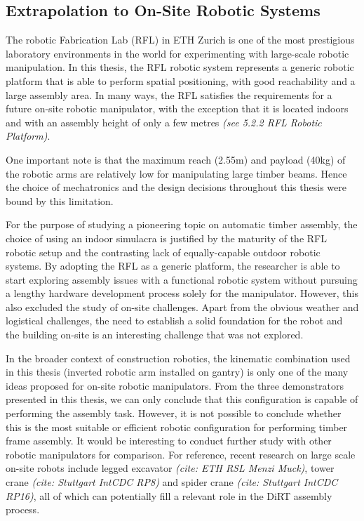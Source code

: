 \subsection{Extrapolation to On-Site Robotic Systems}

The robotic Fabrication Lab (RFL) in ETH Zurich is one of the most prestigious laboratory environments in the world for experimenting with large-scale robotic manipulation. In this thesis, the RFL robotic system represents a generic robotic platform that is able to perform spatial positioning, with good reachability and a large assembly area. In many ways, the RFL satisfies the requirements for a future on-site robotic manipulator, with the exception that it is located indoors and with an assembly height of only a few metres \textit{(see 5.2.2 RFL Robotic Platform)}. 

One important note is that the maximum reach (2.55m) and payload (40kg) of the robotic arms are relatively low for manipulating large timber beams. Hence the choice of mechatronics and the design decisions throughout this thesis were bound by this limitation. 

For the purpose of studying a pioneering topic on automatic timber assembly, the choice of using an indoor simulacra is justified by the maturity of the RFL robotic setup and the contrasting lack of equally-capable outdoor robotic systems. By adopting the RFL as a generic platform, the researcher is able to start exploring assembly issues with a functional robotic system without pursuing a lengthy hardware development process solely for the manipulator. However, this also excluded the study of on-site challenges. Apart from the obvious weather and logistical challenges, the need to establish a solid foundation for the robot and the building on-site is an interesting challenge that was not explored. 

In the broader context of construction robotics, the kinematic combination used in this thesis (inverted robotic arm installed on gantry) is only one of the many ideas proposed for on-site robotic manipulators. From the three demonstrators presented in this thesis, we can only conclude that this configuration is capable of performing the assembly task. However, it is not possible to conclude whether this is the most suitable or efficient robotic configuration for performing timber frame assembly. It would be interesting to conduct further study with other robotic manipulators for comparison. For reference, recent research on large scale on-site robots include legged excavator \textit{(cite: ETH RSL Menzi Muck)}, tower crane\textit{ (cite: Stuttgart IntCDC RP8)} and spider crane\textit{ (cite: Stuttgart IntCDC RP16)}, all of which can potentially fill a relevant role in the DiRT assembly process.

